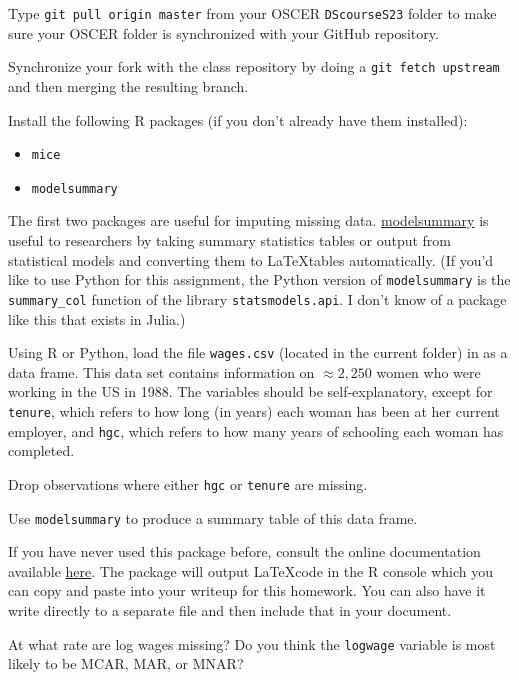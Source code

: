 \documentclass[12pt,english]{exam}
\begin{document}
\begin{questions}
\question Type \texttt{git pull origin master} from your OSCER \texttt{DScourseS23} folder to make sure your OSCER folder is synchronized with your GitHub repository. 

\question Synchronize your fork with the class repository by doing a \texttt{git fetch upstream} and then merging the resulting branch. 

\question Install the following R packages (if you don't already have them installed):
\begin{itemize}
    \item \texttt{mice}
    \item \texttt{modelsummary}
\end{itemize}

The first two packages are useful for imputing missing data.
\href{https://vincentarelbundock.github.io/modelsummary/}{modelsummary} is useful to researchers by taking summary statistics tables or output from statistical models and converting them to \LaTeX tables automatically. (If you'd like to use Python for this assignment, the Python version of \texttt{modelsummary} is the \texttt{summary\_col} function of the library \texttt{statsmodels.api}. I don't know of a package like this that exists in Julia.)

\question Using R or Python, load the file \texttt{wages.csv} (located in the current folder) in as a data frame. This data set contains information on $\approx 2,250$ women who were working in the US in 1988. The variables should be self-explanatory, except for \texttt{tenure}, which refers to how long (in years) each woman has been at her current employer, and \texttt{hgc}, which refers to how many years of schooling each woman has completed.

\question Drop observations where either \texttt{hgc} or \texttt{tenure} are missing.

\question Use \texttt{modelsummary} to produce a summary table of this data frame.

If you have never used this package before, consult the online documentation available \href{https://vincentarelbundock.github.io/modelsummary/}{here}. The package will output \LaTeX code in the R console which you can copy and paste into your writeup for this homework. You can also have it write directly to a separate file and then include that in your document.

At what rate are log wages missing? Do you think the \texttt{logwage} variable is most likely to be MCAR, MAR, or MNAR?


\end{questions}
\end{document}
